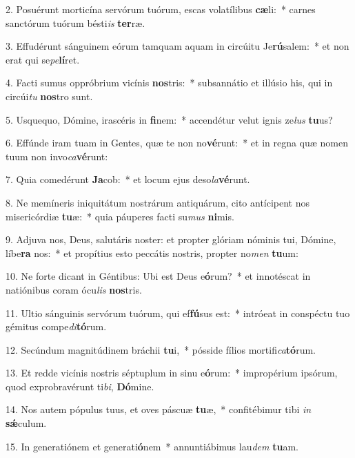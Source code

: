 2. Posuérunt morticína servórum tuórum, escas volatílibus \textbf{cæ}li:~*  carnes sanctórum tuórum bésti\textit{is} \textbf{ter}ræ.\

3. Effudérunt sánguinem eórum tamquam aquam in circúitu Je\textbf{rú}salem:~*  et non erat qui se\textit{pe}\textbf{lí}ret.\

4. Facti sumus oppróbrium vicínis \textbf{nos}tris:~*  subsannátio et illúsio his, qui in circúi\textit{tu} \textbf{nos}tro sunt.\

5. Usquequo, Dómine, irascéris in \textbf{fi}nem:~*  accendétur velut ignis ze\textit{lus} \textbf{tu}us?\

6. Effúnde iram tuam in Gentes, quæ te non no\textbf{vé}runt:~*  et in regna quæ nomen tuum non invo\textit{ca}\textbf{vé}runt:\

7. Quia comedérunt \textbf{Ja}cob:~*  et locum ejus deso\textit{la}\textbf{vé}runt.\

8. Ne memíneris iniquitátum nostrárum antiquárum, cito antícipent nos misericórdiæ \textbf{tu}æ:~*  quia páuperes facti su\textit{mus} \textbf{ni}mis.\

9. Adjuva nos, Deus, salutáris noster: et propter glóriam nóminis tui, Dómine, líbe\textbf{ra} nos:~*  et propítius esto peccátis nostris, propter no\textit{men} \textbf{tu}um:\

10. Ne forte dicant in Géntibus: Ubi est Deus e\textbf{ó}rum?~*  et innotéscat in natiónibus coram ócu\textit{lis} \textbf{nos}tris.\

11. Ultio sánguinis servórum tuórum, qui ef\textbf{fú}sus est:~*  intróeat in conspéctu tuo gémitus compe\textit{di}\textbf{tó}rum.\

12. Secúndum magnitúdinem bráchii \textbf{tu}i,~*  pósside fílios mortifi\textit{ca}\textbf{tó}rum.\

13. Et redde vicínis nostris séptuplum in sinu e\textbf{ó}rum:~*  impropérium ipsórum, quod exprobravérunt ti\textit{bi}, \textbf{Dó}mine.\

14. Nos autem pópulus tuus, et oves páscuæ \textbf{tu}æ,~*  confitébimur tibi \textit{in} \textbf{sǽ}culum.\

15. In generatiónem et generati\textbf{ó}nem~*  annuntiábimus lau\textit{dem} \textbf{tu}am.\

